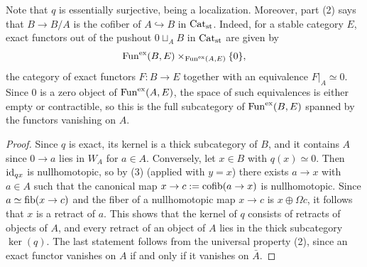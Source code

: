 	Note that $q$ is essentially surjective, being a localization. Moreover, part (2) says that $B \to B/A$ is the cofiber of $A \hookrightarrow B$ in ${\textup{Cat}}_{\operatorname{st}}$. Indeed, for a stable category $E$, exact functors out of the pushout $0 \sqcup_A B$ in ${\textup{Cat}}_{\operatorname{st}}$ are given by
	\[
		\operatorname{Fun}^{\operatorname{ex}}(B,E) \times_{\operatorname{Fun}^{\operatorname{ex}}(A,E)} \{0\},
	\]
	the category of exact functors $F\colon B \to E$ together with an equivalence $F|_A \simeq 0$. Since $0$ is a zero object of $\operatorname{Fun}^{\operatorname{ex}}(A,E)$, the space of such equivalences is either empty or contractible, so this is the full subcategory of $\operatorname{Fun}^{\operatorname{ex}}(B,E)$ spanned by the functors vanishing on $A$.

	\begin{proof}
		Since $q$ is exact, its kernel is a thick subcategory of $B$, and it contains $A$ since $0 \to a$ lies in $W_A$ for $a \in A$. Conversely, let $x \in B$ with $q(x) \simeq 0$. Then $\operatorname{id}_{qx}$ is nullhomotopic, so by (3) (applied with $y = x$) there exists $a \to x$ with $a \in A$ such that the canonical map $x \to c := \operatorname{cofib}(a \to x)$ is nullhomotopic. Since $a \simeq \operatorname{fib}(x \to c)$ and the fiber of a nullhomotopic map $x \to c$ is $x \oplus \Omega c$, it follows that $x$ is a retract of $a$. This shows that the kernel of $q$ consists of retracts of objects of $A$, and every retract of an object of $A$ lies in the thick subcategory $\ker(q)$. The last statement follows from the universal property (2), since an exact functor vanishes on $A$ if and only if it vanishes on $\bar{A}$.
	\end{proof}


